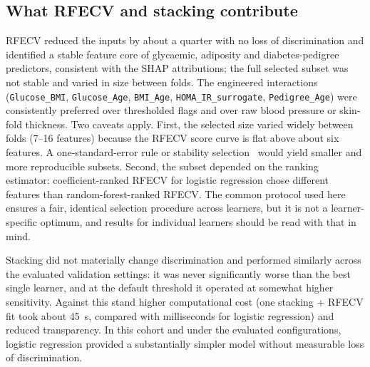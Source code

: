 \documentclass[preprint,12pt,authoryear=false]{elsarticle}
\begin{document}
\subsection{What RFECV and stacking contribute}
RFECV reduced the inputs by about a quarter with no loss of discrimination and identified a stable feature core of glycaemic, adiposity and diabetes-pedigree predictors, consistent with the SHAP attributions; the full selected subset was not stable and varied in size between folds. The engineered interactions (\texttt{Glucose\_BMI}, \texttt{Glucose\_Age}, \texttt{BMI\_Age}, \texttt{HOMA\_IR\_surrogate}, \texttt{Pedigree\_Age}) were consistently preferred over thresholded flags and over raw blood pressure or skin-fold thickness. Two caveats apply. First, the selected size varied widely between folds (7--16 features) because the RFECV score curve is flat above about six features. A one-standard-error rule or stability selection~\cite{meinshausen2010stability} would yield smaller and more reproducible subsets. Second, the subset depended on the ranking estimator: coefficient-ranked RFECV for logistic regression chose different features than random-forest-ranked RFECV. The common protocol used here ensures a fair, identical selection procedure across learners, but it is not a learner-specific optimum, and results for individual learners should be read with that in mind.

Stacking did not materially change discrimination and performed similarly across the evaluated validation settings: it was never significantly worse than the best single learner, and at the default threshold it operated at somewhat higher sensitivity. Against this stand higher computational cost (one stacking + RFECV fit took about 45~s, compared with milliseconds for logistic regression) and reduced transparency. In this cohort and under the evaluated configurations, logistic regression provided a substantially simpler model without measurable loss of discrimination.
\end{document}
